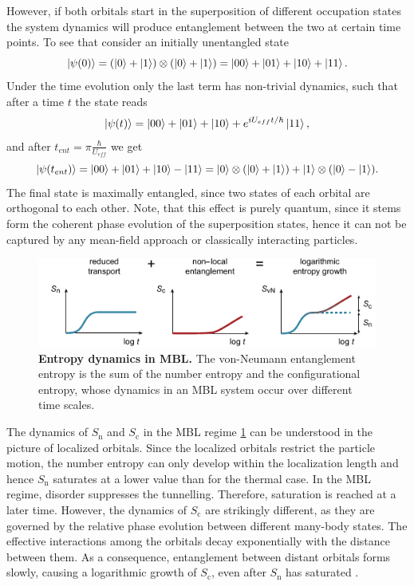 However, if both orbitals start in the superposition of different occupation states the system dynamics will produce entanglement between the two at certain time points. To see that consider an initially unentangled state 
\begin{equation}
\left|\psi(0)\right\rangle = (\left|0\right\rangle+\left|1\right\rangle)\otimes(\left|0\right\rangle+\left|1\right\rangle) = \left|00\right\rangle+\left|01\right\rangle+\left|10\right\rangle+\left|11\right\rangle.
\end{equation}
Under the time evolution only the last term has non-trivial dynamics, such that after a time $t$ the state reads
\begin{equation}
\left|\psi(t)\right\rangle = \left|00\right\rangle+\left|01\right\rangle+\left|10\right\rangle+e^{iU_{eff}t/\hbar}\left|11\right\rangle,
\end{equation}
and after $t_{ent}=\pi \frac{\hbar}{U_{eff}}$ we get
\begin{equation}
\left|\psi(t_{ent})\right\rangle = \left|00\right\rangle+\left|01\right\rangle+\left|10\right\rangle-\left|11\right\rangle = \left|0\right\rangle\otimes(\left|0\right\rangle+\left|1\right\rangle)+\left|1\right\rangle\otimes(\left|0\right\rangle -\left|1\right\rangle).
\end{equation}
The final state is maximally entangled, since two states of each orbital are orthogonal to each other. Note, that this effect is purely quantum, since it stems form the coherent phase evolution of the superposition states, hence it can not be captured by any mean-field approach or classically interacting particles.

\begin{figure}[t]
	\centering
	\includegraphics[scale=1.6]{figures/MBL_ent_split.pdf}
	\caption{{\bf Entropy dynamics in MBL.} The von-Neumann entanglement entropy is the sum of the number entropy and the configurational entropy, whose dynamics in an MBL system occur over different time scales.}
	\label{fig:MBL_ent_concept}
\end{figure}

The dynamics of $S_\text{n}$ and $S_\text{c}$ in the MBL regime \ref{fig:MBL_ent_concept} can be understood in the picture of localized orbitals. Since the localized orbitals restrict the particle motion, the number entropy can only develop within the localization length and hence $S_\text{n}$ saturates at a lower value than for the thermal case. In the MBL regime, disorder suppresses the tunnelling. Therefore, saturation is reached at a later time. However, the dynamics of $S_\text{c}$ are strikingly different, as they are governed by the relative phase evolution between different many-body states.  The effective interactions among the orbitals decay exponentially with the distance between them. As a consequence, entanglement between distant orbitals forms slowly, causing a logarithmic growth of $S_\text{c}$, even after $S_\text{n}$ has saturated \cite{Serbyn2013, Serbyn2013a, Huse2014, Znidaric2008, Bardarson2012}.

